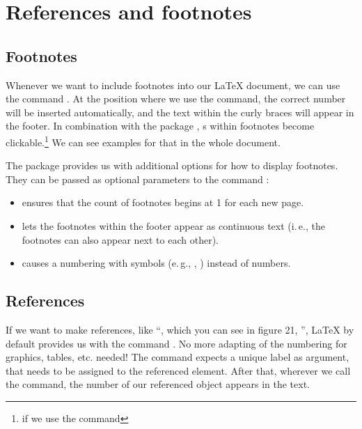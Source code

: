 \chapter{References and footnotes}
\section{Footnotes}\label{sec:footnotes}


Whenever we want to include footnotes into our \LaTeX{} document, we can use 
the command . At the position where we use 
the command, the correct number will be inserted automatically, and the text 
within the curly braces will appear in the footer. In combination with the 
package , s within footnotes become 
clickable.\footnote{if we use the command }
We can see examples for that in the whole document.

The package  provides us with additional options for how to display footnotes. They can be passed as optional parameters to the command :
\begin{itemize}
  \item {} ensures that the count of footnotes begins at 1 for each new page.
  \item {} lets the footnotes within the footer appear as continuous text (i.\,e., the footnotes can also appear next to each other).
  \item {} causes a numbering with symbols (e.\,g.,  \textdagger, \textdaggerdbl) instead of numbers.
\end{itemize}


\section{References}\label{sec:references}

If we want to make references, like \enquote{\textellipsis , which you can see 
in figure 21, \textellipsis}, \LaTeX{} by default provides us with the command 
. No more adapting of the numbering 
for graphics, tables, etc. needed!
The command expects a unique label as argument, that needs to be assigned to 
the referenced element. After that, wherever we call the command, the number of 
our referenced object appears in the text.

